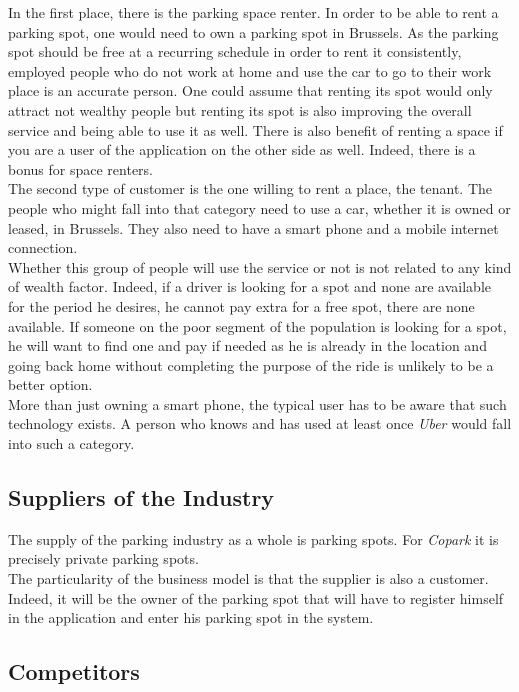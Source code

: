 \documentclass[12pt,a4paper,oneside]{book}
\newcommand{\bp}{\textit{Copark}}
\begin{document}
In the first place, there is the parking space renter. In order to be able to rent a parking spot, one would need to own a parking spot in Brussels. As the parking spot should be free at a recurring schedule in order to rent it consistently, employed people who do not work at home and use the car to go to their work place is an accurate person. One could assume that renting its spot would only attract not wealthy people but renting its spot is also improving the overall service and being able to use it as well. There is also benefit of renting a space if you are a user of the application on the other side as well. Indeed, there is a bonus for space renters.\\

The second type of customer is the one willing to rent a place, the tenant. The people who might fall into that category need to use a car, whether it is owned or leased, in Brussels. They also need to have a smart phone and a mobile internet connection.\\

Whether this group of people will use the service or not is not related to any kind of wealth factor. Indeed, if a driver is looking for a spot and none are available for the period he desires, he cannot pay extra for a free spot, there are none available. If someone on the poor segment of the population is looking for a spot, he will want to find one and pay if needed as he is already in the location and going back home without completing the purpose of the ride is unlikely to be a better option.\\

More than just owning a smart phone, the typical user has to be aware that such technology exists. A person who knows and has used at least once \textit{Uber} would fall into such a category.

\subsection{Suppliers of the Industry}
The supply of the parking industry as a whole is parking spots. For \bp{} it is precisely private parking spots.\\

The particularity of the business model is that the supplier is also a customer. Indeed, it will be the owner of the parking spot that will have to register himself in the application and enter his parking spot in the system.

\subsection{Competitors}
\end{document}
